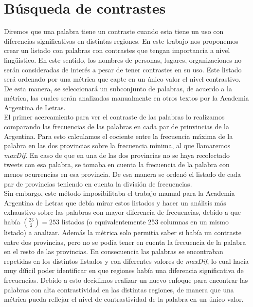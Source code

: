 

\section{Búsqueda de contrastes}

Diremos que una palabra tiene un contraste cuando esta tiene un uso con diferencias significativas en
distintas regiones. En este trabajo nos proponemos crear un listado con palabras con contrastes que tengan
importancia a nivel lingüistico. En este sentido, los nombres de personas, lugares, organizaciones no 
serán consideradas de interés a pesar de tener contrastes en su uso.
Este listado será ordenado por una métrica que capte en un único valor el nivel contrastivo. De esta manera, 
se seleccionará un subconjunto de palabras, de acuerdo a la métrica, las cuales serán analizadas manualmente en otros textos por la Academia Argentina de Letras.\\




El primer acercamiento para ver el contraste de las palabras lo realizamos comparando las frecuencias de las palabras 
en cada par de prinvincias de la Argentina. Para esto calculamos el cociente entre la frecuencia máxima de la palabra
en las dos provincias sobre la frecuencia mínima, al que llamaremos \textit{maxDif}. En caso de que en una de las dos provincias no se haya 
recolectado tweets con esa palabra, se tomaba en cuenta la frecuencia de la palabra con menos ocurrencias en esa provincia.
De esa manera se ordenó el listado de cada par de provincias teniendo en cuenta la división de frecuencias. \\
Sin embargo, este método imposibilitaba el trabajo manual para la Academia Argentina de Letras que debía mirar estos listados y hacer un análisis más exhaustivo sobre las palabras con mayor diferencia de frecuencias, debido a que había $\binom{23}{2} = 253$
listados (o equivalentemente 253 columnas en un mismo listado) a analizar. Además la métrica solo permitía saber si había un contraste entre dos provincias, pero no se podía tener en cuenta la frecuencia de la palabra en el resto de las provincias. 
En consecuencia las palabras se encontraban repetidas en los distintos listados y con diferentes valores de \textit{maxDif}, lo cual hacía muy díficil poder identificar en que regiones había una diferencia significativa de frecuencias. Debido a esto decidimos realizar un nuevo enfoque para encontrar las palabras con alta contrastividad en las distintas regiones, de manera que una métrica pueda reflejar el nivel de contrastividad de la palabra en un único valor.

